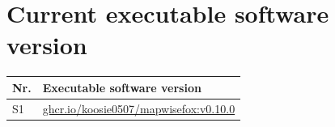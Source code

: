 \documentclass[preprint,12pt, a4paper]{elsarticle}
\begin{document}





\section*{Current executable software version}
\begin{tabular}{|l|p{10cm}|}
  \hline
  \textbf{Nr.} & \textbf{Executable software version} \\
  \hline
  S1 &
  \href{https://github.com/koosie0507/mapwisefox/pkgs/container/mapwisefox/1141539240?tag=v0.10.0}{ghcr.io/koosie0507/mapwisefox:v0.10.0}
  \\
  \hline
\end{tabular}
\end{document}
